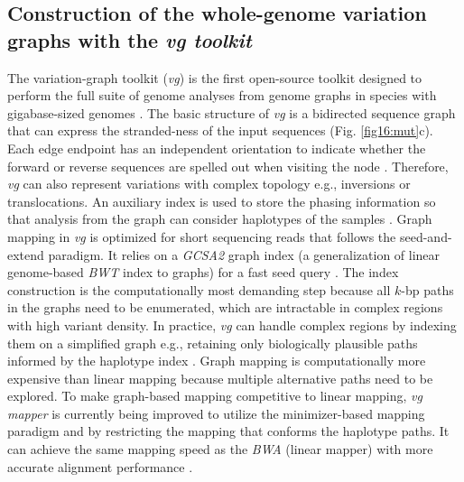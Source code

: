 \documentclass[../main.tex]{subfiles}
\begin{document}
\subsection*{Construction of the whole-genome variation graphs with the \emph{vg toolkit}}

The variation-graph toolkit (\emph{vg}) is the first open-source toolkit designed to perform the full suite of genome analyses from genome graphs in species with gigabase-sized genomes \citep{garrison2018variation}. The basic structure of \emph{vg} is a bidirected sequence graph that can express the stranded-ness of the input sequences (Fig. \ref{fig16:mut}c). Each edge endpoint has an independent orientation to indicate whether the forward or reverse sequences are spelled out when visiting the node \citep{paten2017genome}. Therefore, \emph{vg} can also represent variations with complex topology e.g., inversions or translocations. An auxiliary index is used to store the phasing information so that analysis from the graph can consider haplotypes of the samples \citep{siren2020haplotype}. Graph mapping in \emph{vg} is optimized for short sequencing reads that follows the seed-and-extend paradigm. It relies on a \emph{GCSA2 }graph index (a generalization of linear genome-based\emph{ BWT} index to graphs) for a fast seed query \citep{siren2017indexing}. The index construction is the computationally most demanding step because all $k$-bp paths in the graphs need to be enumerated, which are intractable in complex regions with high variant density. In practice, \emph{vg} can handle complex regions by indexing them on a simplified graph e.g., retaining only biologically plausible paths informed by the haplotype index \citep{siren2017indexing}. Graph mapping is computationally more expensive than linear mapping because multiple alternative paths need to be explored. To make graph-based mapping competitive to linear mapping, \emph{vg mapper} is currently being improved to utilize the minimizer-based mapping paradigm and by restricting the mapping that conforms the haplotype paths. It can achieve the same mapping speed as the \emph{BWA} (linear mapper) with more accurate alignment performance \citep{siren2020genotyping}. 
\end{document}
